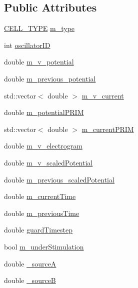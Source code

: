 \subsection*{Public Attributes}
\begin{DoxyCompactItemize}
\item 
\hyperlink{heart_defines_8h_a2f059cd81f362503874790462d535f5b}{C\+E\+L\+L\+\_\+\+T\+Y\+P\+E} \hyperlink{class_oscillator_a7553dcea69896c2f3ff2bc8bda1d05cc}{m\+\_\+type}
\item 
int \hyperlink{class_oscillator_acfc962cfc0b6c92fc8ae8d7254346bef}{oscillator\+I\+D}
\item 
double \hyperlink{class_oscillator_a44d11f6d153d4a061fc1bbb6785ddc18}{m\+\_\+v\+\_\+potential}
\item 
double \hyperlink{class_oscillator_a2a1649ababe43b1de3dbd6d5f24db703}{m\+\_\+previous\+\_\+potential}
\item 
std\+::vector$<$ double $>$ \hyperlink{class_oscillator_a344928736ed0deb40bc1c73d50af5d33}{m\+\_\+v\+\_\+current}
\item 
double \hyperlink{class_oscillator_aedf0974c19ea8428e3702f267cf45465}{m\+\_\+potential\+P\+R\+I\+M}
\item 
std\+::vector$<$ double $>$ \hyperlink{class_oscillator_aef644a4e5faf78fa338a7a5e739f267c}{m\+\_\+current\+P\+R\+I\+M}
\item 
double \hyperlink{class_oscillator_ab65a59d93c248616facbd1f01b3c2b87}{m\+\_\+v\+\_\+electrogram}
\item 
double \hyperlink{class_oscillator_aae4aa22ad331c19871be91d7cc5ceafa}{m\+\_\+v\+\_\+scaled\+Potential}
\item 
double \hyperlink{class_oscillator_a45a1214b84b342e4ee078d218112f001}{m\+\_\+previous\+\_\+scaled\+Potential}
\item 
double \hyperlink{class_oscillator_abe68e99fc990a44b9bd234751eec0f24}{m\+\_\+current\+Time}
\item 
double \hyperlink{class_oscillator_ab97f31715485a24f49c98a01caa9f2d8}{m\+\_\+previous\+Time}
\item 
double \hyperlink{class_oscillator_a4db30c0516d078b69426aad65bf13022}{guard\+Timestep}
\item 
bool \hyperlink{class_oscillator_aeaa03f804f9d13f27635b94ea7a6bd32}{m\+\_\+under\+Stimulation}
\item 
double \hyperlink{class_oscillator_a968627d069d5f0c44d8134718a01237f}{\+\_\+source\+A}
\item 
double \hyperlink{class_oscillator_a5a144fd5dd7cbcbfc47d7c9013d330b8}{\+\_\+source\+B}

\end{DoxyCompactItemize}
